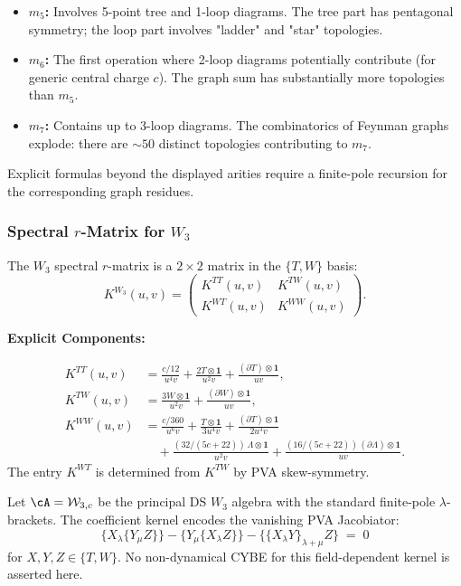 \begin{itemize}
\item \textbf{$m_5$:} Involves 5-point tree and 1-loop diagrams. The tree part has pentagonal symmetry; the loop part involves "ladder" and "star" topologies.

\item \textbf{$m_6$:} The first operation where 2-loop diagrams potentially contribute (for generic central charge $c$). The graph sum has substantially more topologies than $m_5$.

\item \textbf{$m_7$:} Contains up to 3-loop diagrams. The combinatorics of Feynman graphs explode: there are $\sim 50$ distinct topologies contributing to $m_7$.
\end{itemize}

Explicit formulas beyond the displayed arities require a finite-pole
recursion for the corresponding graph residues.

\subsubsection{Spectral $r$-Matrix for $W_3$}

The $W_3$ spectral $r$-matrix is a $2 \times 2$ matrix in the $\{T, W\}$ basis:
\begin{equation}
K^{W_3}(u, v) = \begin{pmatrix}
K^{TT}(u,v) & K^{TW}(u,v) \\
K^{WT}(u,v) & K^{WW}(u,v)
\end{pmatrix}.
\end{equation}

\textbf{Explicit Components:}

\begin{align}
K^{TT}(u,v) &= \frac{c/12}{u^4 v} + \frac{2T \otimes \mathbf{1}}{u^2 v} + \frac{(\partial T) \otimes \mathbf{1}}{u v},\\
K^{TW}(u,v) &= \frac{3W \otimes \mathbf{1}}{u^2 v} + \frac{(\partial W) \otimes \mathbf{1}}{u v},\\
K^{WW}(u,v) &= \frac{c/360}{u^6 v} + \frac{T \otimes \mathbf{1}}{3u^4 v} + \frac{(\partial T) \otimes \mathbf{1}}{2u^3 v} \\
&\quad + \frac{(32/(5c+22))\,\Lambda \otimes \mathbf{1}}{u^2 v} + \frac{(16/(5c+22))\,(\partial\Lambda) \otimes \mathbf{1}}{u v}.
\end{align}
The entry $K^{WT}$ is determined from $K^{TW}$ by PVA skew-symmetry.

\begin{theorem}
Let\/ $\cA=\mathcal W_{3,c}$ be the principal DS $W_3$ algebra with
the standard finite-pole $\lambda$-brackets.
The coefficient kernel encodes the vanishing PVA Jacobiator:
\begin{equation}
\{X_\lambda \{Y_\mu Z\}\}
- \{Y_\mu \{X_\lambda Z\}\}
- \{\{X_\lambda Y\}_{\lambda+\mu} Z\}
\;=\;0
\end{equation}
for $X,Y,Z\in\{T,W\}$. No non-dynamical CYBE for this
field-dependent kernel is asserted here.
\end{theorem}

